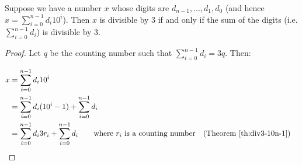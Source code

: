 
\begin{theorem}
Suppose we have a number $x$ whose digits are $d_{n-1}, ..., d_1, d_0$ (and hence $x = \sum_{i=0}^{n-1} d_i 10^i$). Then $x$ is divisible by 3 if and only if the sum of the digits (i.e. $\sum_{i=0}^{n-1} d_i$) is divisible by 3.
\end{theorem}
\begin{proof}
Let $q$ be the counting number such that $\sum_{i=0}^{n-1} d_i = 3q$. Then:

\begin{align*}
x &= \sum_{i=0}^{n-1} d_i 10^i \\
&= \sum_{i=0}^{n-1} d_i (10^i - 1) + \sum_{i=0}^{n-1} d_i \\
&= \sum_{i=0}^{n-1} d_i 3r_i + \sum_{i=0}^{n-1} d_i \text{\qquad where $r_i$ is a counting number} && \text{(Theorem \ref{th:div3-10n-1})} \\
\end{align*}
\end{proof}






